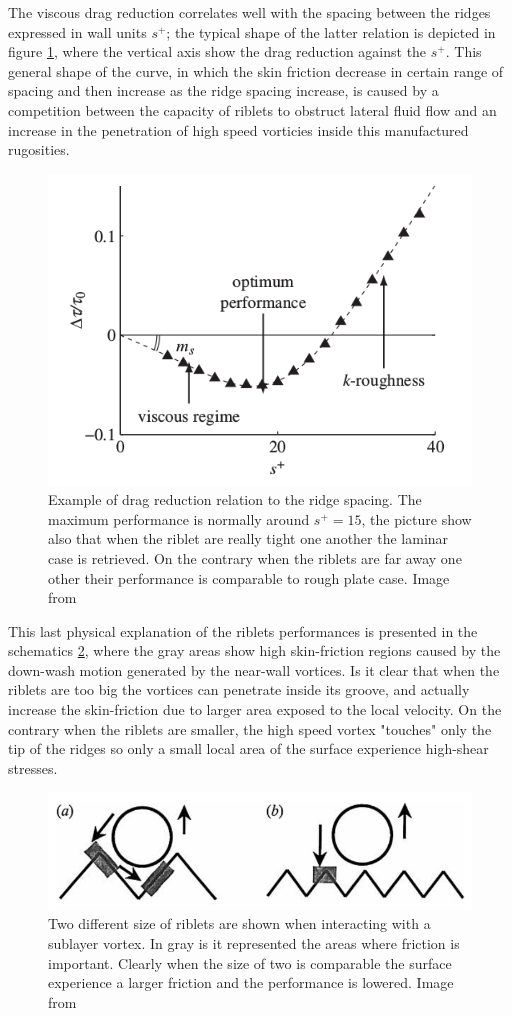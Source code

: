 The viscous drag reduction correlates well with the spacing between the ridges expressed in wall units $ s^+ $; the typical shape of the latter relation is depicted in figure \ref{fig:riblets_perf}, where the vertical axis show the drag reduction against the $ s^+ $.
This general shape of the curve, in which the skin friction decrease in certain range of spacing and then increase as the ridge spacing  increase, is caused by a competition between the capacity of riblets to obstruct lateral fluid flow and an increase in the penetration of high speed vorticies inside this manufactured rugosities.

\begin{figure}[h]
	\centering
	\includegraphics[width=0.5\linewidth]{chapter_1/riblets_performance}
	\caption{Example of drag reduction relation to the ridge spacing. The maximum performance is normally around $ s^+ = 15 $, the picture show also that when the riblet are really tight one another the laminar case is retrieved. On the contrary when the riblets are far away one other their performance is comparable to rough plate case. Image from \citet{jimenez2001turbulent} }
	\label{fig:riblets_perf}
\end{figure}

This last physical explanation of the riblets performances is presented in the schematics \ref{fig:riblets_schem}, where the gray areas show high skin-friction regions caused by the down-wash motion generated by the near-wall vortices.
Is it clear that when the riblets are too big the vortices can penetrate inside its groove, and actually increase the skin-friction due to larger area exposed to the local velocity.
On the contrary when the riblets are smaller, the high speed vortex "touches" only the tip of the ridges so only a small local area of the surface experience high-shear stresses.

\begin{figure}[h]
	\centering
	\includegraphics[width=0.7\linewidth]{chapter_1/riblets1}
	\caption{Two different size of riblets are shown when interacting with a sublayer vortex. In gray is it represented the areas where friction is important. Clearly when the size of two is comparable the surface experience a larger friction and the performance is lowered. Image from \citet{choi1993direct}}
	\label{fig:riblets_schem}
\end{figure}

